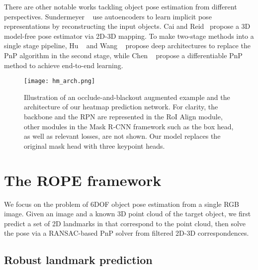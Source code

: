 \documentclass[10pt,twocolumn,letterpaper]{article}
\begin{document}
There are other notable works tackling object pose estimation from different perspectives. Sundermeyer \etal~\cite{sundermeyer2020augmented, sundermeyer2020multi} use autoencoders to learn implicit pose representations by reconstructing the input objects. Cai and Reid~\cite{Cai2020reconstruct} propose a 3D model-free pose estimator via 2D-3D mapping. To make two-stage methods into a single stage pipeline, Hu \etal~\cite{Hu2020single} and Wang \etal~\cite{wang2021gdr} propose deep architectures to replace the PnP algorithm in the second stage, while Chen \etal~\cite{Chen2020end} propose a differentiable PnP method to achieve end-to-end learning. 






























\begin{figure*}[t]
    \centering
    \texttt{[image: hm\_arch.png]}
    \caption{Illustration of an occlude-and-blackout augmented example and the architecture of our heatmap prediction network. For clarity, the backbone and the RPN are represented in the RoI Align module, other modules in the Mask R-CNN framework such as the box head, as well as relevant losses, are not shown. Our model replaces the original mask head with three keypoint heads.}
    \label{fig:hm_arch}
\end{figure*}

\section{The ROPE framework}

We focus on the problem of 6DOF object pose estimation from a single RGB image. Given an image  and a known 3D point cloud  of the target object, we first predict a set of 2D landmarks  in  that correspond to the point cloud, then solve the pose  via a RANSAC-based PnP solver from filtered 2D-3D correspondences. 





\subsection{Robust landmark prediction}
\end{document}
